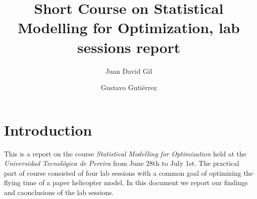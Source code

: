 \documentclass[DIV=20]{scrartcl}
\title{Short Course on Statistical Modelling for Optimization, lab sessions
report}
\author{Juan David Gil \and Gustavo Gutiérrez}
\date{}
\begin{document}
\maketitle
\section{Introduction}
This is a report on the course \emph{Statistical Modelling for Optimization}
held at the \emph{Universidad Tecnológica de Pereira} from June 28th to July
1st. The practical part of course consisted of four lab sessions with a common
goal of optimizing the flying time of a paper helicopter model. In this document
we report our findings and caonclusions of the lab sessions.

%


\end{document}
